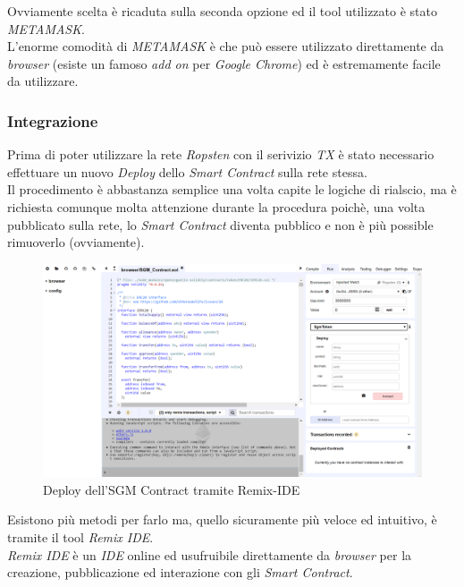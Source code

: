 \documentclass[11pt]{thesistemp}
\begin{document}
Ovviamente scelta è ricaduta sulla seconda opzione ed il tool utilizzato è stato \textit{METAMASK}.\\
L'enorme comodità di \textit{METAMASK} è che può essere utilizzato direttamente da \textit{browser} (esiste un famoso \textit{add on} per \textit{Google Chrome}) ed è estremamente facile da utilizzare.
\pagebreak

\subsubsection{Integrazione}
Prima di poter utilizzare la rete \textit{Ropsten} con il serivizio \textit{TX} è stato necessario effettuare un nuovo \textit{Deploy} dello \textit{Smart Contract} sulla rete stessa.\\
Il procedimento è abbastanza semplice una volta capite le logiche di rialscio, ma è richiesta comunque molta attenzione durante la procedura poichè, una volta pubblicato sulla rete, lo \textit{Smart Contract} diventa pubblico e non è più possible rimuoverlo (ovviamente).\\
\begin{figure}[h]
    \centering
    \includegraphics[scale=0.4]{sgm-contract-deploy.png}
        \caption{Deploy dell'SGM Contract tramite Remix-IDE}
    \label{fig:sgm-contract-deploy}
\end{figure}
\linebreak
Esistono più metodi per farlo ma, quello sicuramente più veloce ed intuitivo, è tramite il tool \textit{Remix IDE}.\\
\textit{Remix IDE} è un \textit{IDE} online ed usufruibile direttamente da \textit{browser} per la creazione, pubblicazione ed interazione con gli \textit{Smart Contract}.\\
\end{document}
